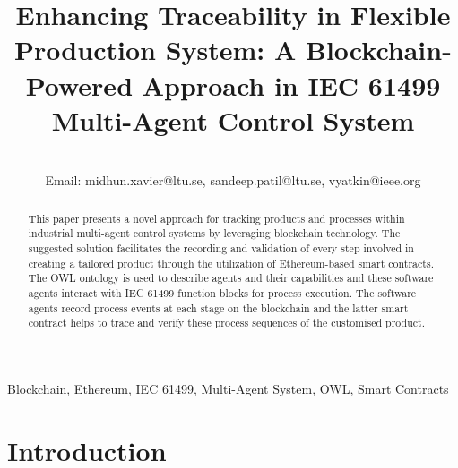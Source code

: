 \documentclass[conference]{IEEEtran}
\begin{document}
\title{Enhancing Traceability in Flexible Production System: A Blockchain-Powered Approach in IEC 61499 Multi-Agent Control System }


\author{







\\ Email: midhun.xavier@ltu.se, sandeep.patil@ltu.se, vyatkin@ieee.org
}

\maketitle

\begin{abstract}
This paper presents a novel approach for tracking products and processes within industrial multi-agent control systems by leveraging blockchain technology. The suggested solution facilitates the recording and validation of every step involved in creating a tailored product through the utilization of Ethereum-based smart contracts. The OWL ontology is used to describe agents and their capabilities and these software agents interact with IEC 61499 function blocks for process execution. The software agents record process events at each stage on the blockchain and the latter smart contract helps to trace and verify these process sequences of the customised product.


\end{abstract}

\begin{IEEEkeywords}
Blockchain, Ethereum, IEC 61499, Multi-Agent System, OWL, Smart Contracts

\end{IEEEkeywords}

\section{Introduction}
\end{document}
